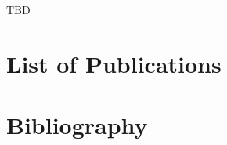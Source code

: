 \documentclass[11pt,final]{tutdrthesis}
\begin{document}
%
TBD

\chapter{List of Publications}


\setcounter{secnumdepth}{2}
\mainmatter






\setcounter{secnumdepth}{-1}
\chapter{Bibliography}
%



\end{document}
